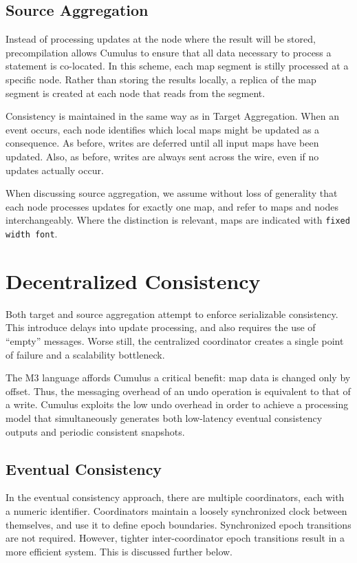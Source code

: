 \documentclass{vldb}
\begin{document}
\subsection{Source Aggregation}
Instead of processing updates at the node where the result will be stored, precompilation allows Cumulus to ensure that all data necessary to process a statement is co-located. In this scheme, each map segment is stilly processed at a specific node.  Rather than storing the results locally, a replica of the map segment is created at each node that reads from the segment.  

Consistency is maintained in the same way as in Target Aggregation.  When an event occurs, each node identifies which local maps might be updated as a consequence.  As before, writes are deferred until all input maps have been updated.  Also, as before, writes are always sent across the wire, even if no updates actually occur.  

When discussing source aggregation, we assume without loss of generality that each node processes updates for exactly one map, and refer to maps and nodes interchangeably.  Where the distinction is relevant, maps are indicated with \texttt{fixed width font}.

\section{Decentralized Consistency}
Both target and source aggregation attempt to enforce serializable consistency.  This introduce delays into update processing, and also requires the use of ``empty'' messages.  Worse still, the centralized coordinator creates a single point of failure and a scalability bottleneck.  

The M3 language affords Cumulus a critical benefit: map data is changed only by offset.  Thus, the messaging overhead of an undo operation is equivalent to that of a write.  Cumulus exploits the low undo overhead in order to achieve a processing model that simultaneously generates both low-latency eventual consistency outputs and periodic consistent snapshots.  

\subsection{Eventual Consistency}
\label{sec:eventualconsistency}
In the eventual consistency approach, there are multiple coordinators, each with a numeric identifier.  Coordinators maintain a loosely synchronized clock between themselves, and use it to define epoch boundaries.  Synchronized epoch transitions are not required.  However, tighter inter-coordinator epoch transitions result in a more efficient system.  This is discussed further below.
\end{document}
